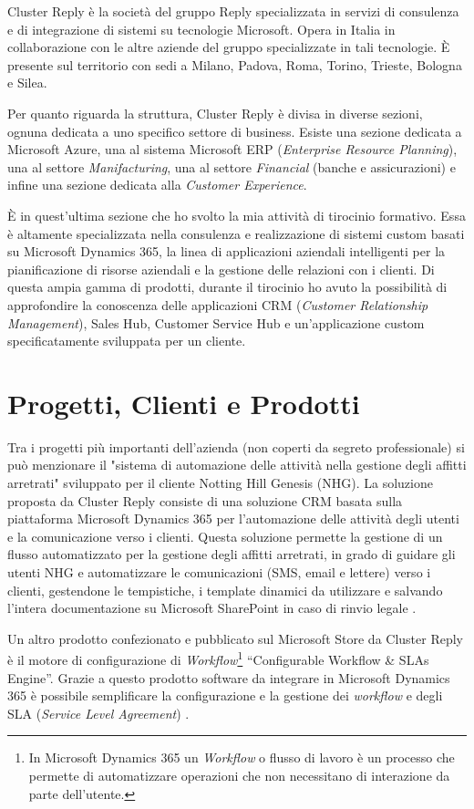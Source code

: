 Cluster Reply è la società del gruppo Reply specializzata in servizi di consulenza e di integrazione di sistemi su tecnologie Microsoft. Opera in Italia in collaborazione con le altre aziende del gruppo specializzate in tali tecnologie. È presente sul territorio con sedi a Milano, Padova, Roma, Torino, Trieste, Bologna e Silea. 

Per quanto riguarda la struttura, Cluster Reply è divisa in diverse sezioni, ognuna dedicata a uno specifico settore di business. Esiste una sezione dedicata a Microsoft Azure, una al sistema Microsoft ERP (\textit{Enterprise Resource Planning}), una al settore \textit{Manifacturing}, una al settore \textit{Financial} (banche e assicurazioni) e infine una sezione dedicata alla \textit{Customer Experience}.

È in quest'ultima sezione che ho svolto la mia attività di tirocinio formativo. Essa è altamente specializzata nella consulenza e realizzazione di sistemi custom basati su Microsoft Dynamics 365, la linea di applicazioni aziendali intelligenti per la pianificazione di risorse aziendali e la gestione delle relazioni con i clienti. Di questa ampia gamma di prodotti, durante il tirocinio ho avuto la possibilità di approfondire la conoscenza delle applicazioni CRM (\textit{Customer Relationship Management}), Sales Hub, Customer Service Hub e un'applicazione custom specificatamente sviluppata per un cliente.

\section{Progetti, Clienti e Prodotti}
Tra i progetti più importanti dell'azienda (non coperti da segreto professionale) si può menzionare il "sistema di automazione delle attività nella gestione degli affitti arretrati" sviluppato per il cliente Notting Hill Genesis (NHG). La soluzione proposta da Cluster Reply consiste di una soluzione CRM basata sulla piattaforma Microsoft Dynamics 365 per l'automazione  delle attività degli utenti e la comunicazione verso i clienti. Questa soluzione permette la gestione di un flusso automatizzato per la gestione degli affitti arretrati, in grado di guidare gli utenti NHG e automatizzare le comunicazioni (SMS, email e lettere) verso i clienti, gestendone le tempistiche, i template dinamici da utilizzare e salvando l'intera documentazione su Microsoft SharePoint in caso di rinvio legale \cite{NHG}.

Un altro prodotto confezionato e pubblicato sul Microsoft Store da Cluster Reply è il motore di configurazione di \textit{Workflow}\footnote{In Microsoft Dynamics 365 un \textit{Workflow} o flusso di lavoro è un processo che permette di automatizzare operazioni che non necessitano di interazione da parte dell'utente.} “Configurable Workflow \& SLAs Engine”. Grazie a questo prodotto software da integrare in Microsoft Dynamics 365 è possibile semplificare la configurazione e la gestione dei \textit{workflow} e degli SLA (\textit{Service Level Agreement}) \cite{configurableWorkflow}.

